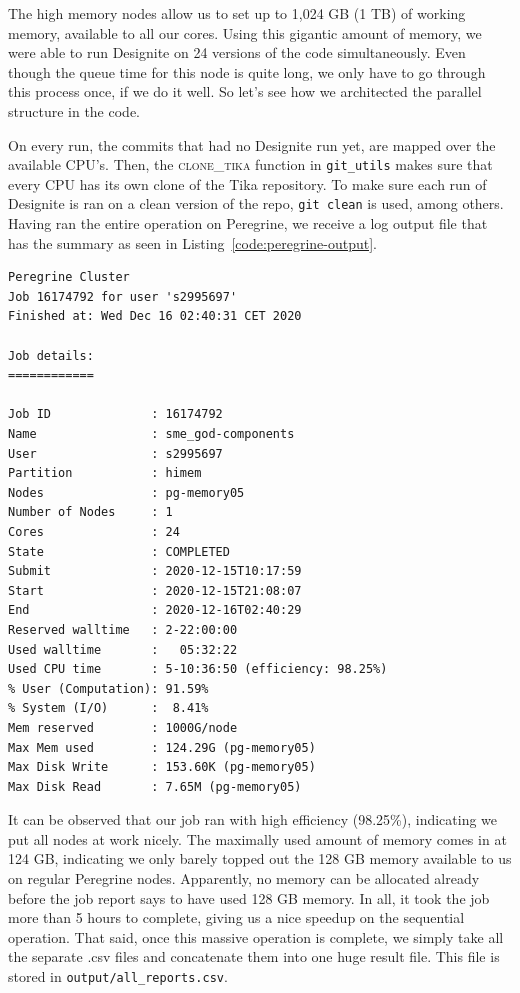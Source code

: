 \documentclass{article}
\begin{document}
The high memory nodes allow us to set up to 1,024 GB (1 TB) of working memory, available to all our cores. Using this gigantic amount of memory, we were able to run Designite on 24 versions of the code simultaneously. Even though the queue time for this node is quite long, we only have to go through this process once, if we do it well. So let's see how we architected the parallel structure in the code.

On every run, the commits that had no Designite run yet, are mapped over the available CPU's. Then, the \textsc{clone\_tika} function in \texttt{git\_utils} makes sure that every CPU has its own clone of the Tika repository. To make sure each run of Designite is ran on a clean version of the repo, \texttt{git clean} is used, among others. Having ran the entire operation on Peregrine, we receive a log output file that has the summary as seen in Listing~\ref{code:peregrine-output}.

\begin{lstlisting}[caption={Peregrine job output.}, label={code:peregrine-output}]
Peregrine Cluster
Job 16174792 for user 's2995697'
Finished at: Wed Dec 16 02:40:31 CET 2020

Job details:
============

Job ID              : 16174792
Name                : sme_god-components
User                : s2995697
Partition           : himem
Nodes               : pg-memory05
Number of Nodes     : 1
Cores               : 24
State               : COMPLETED
Submit              : 2020-12-15T10:17:59
Start               : 2020-12-15T21:08:07
End                 : 2020-12-16T02:40:29
Reserved walltime   : 2-22:00:00
Used walltime       :   05:32:22
Used CPU time       : 5-10:36:50 (efficiency: 98.25%)
% User (Computation): 91.59%
% System (I/O)      :  8.41%
Mem reserved        : 1000G/node
Max Mem used        : 124.29G (pg-memory05)
Max Disk Write      : 153.60K (pg-memory05)
Max Disk Read       : 7.65M (pg-memory05)
\end{lstlisting}

It can be observed that our job ran with high efficiency (98.25\%), indicating we put all nodes at work nicely. The maximally used amount of memory comes in at 124 GB, indicating we only barely topped out the 128 GB memory available to us on regular Peregrine nodes. Apparently, no memory can be allocated already before the job report says to have used 128 GB memory. In all, it took the job more than 5 hours to complete, giving us a nice speedup on the sequential operation. That said, once this massive operation is complete, we simply take all the separate .csv files and concatenate them into one huge result file. This file is stored in \texttt{output/all\_reports.csv}.
\end{document}
